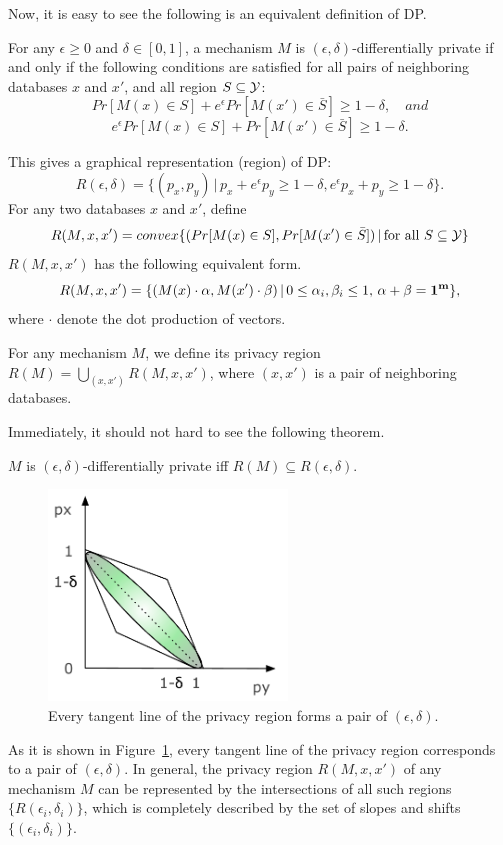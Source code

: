 \documentclass[11pt]{article}
\begin{document}
Now, it is easy to see the following is an equivalent definition of DP.
\begin{theorem}
For any $\epsilon \geq 0$ and $\delta \in [0, 1]$, a mechanism $M$ is $(\epsilon, \delta)$-differentially private if and only if the following conditions are satisfied for all pairs of neighboring databases $x$ and $x'$, and all region $S \subseteq {\cal Y}$:
\[
Pr[M(x) \in S]+e^{\epsilon}Pr[M(x') \in \bar{S}] \geq 1-\delta , \quad and
\]
\[
e^{\epsilon}Pr[M(x) \in S]+Pr[M(x') \in \bar{S}]  \geq 1-\delta .
\]
\end{theorem}
This gives a graphical representation (region) of DP:
\[
R(\epsilon, \delta) = \{(p_{x},p_{y}) \,|\, p_{x}+e^{\epsilon}p_{y} \geq1 - \delta,  e^{\epsilon}p_{x}+p_{y} \geq 1 - \delta\} .
\]
For any two databases $x$ and $x'$, define
\[
R(M, x, x') = convex \{(Pr[M(x) \in S], Pr[M(x') \in \bar{S}]) \,|\, \text{for all }S \subseteq {\cal Y} \}
\]
$R(M,x,x')$ has the following equivalent form.
\[
R(M,x,x') = \{ (M(x) \cdot {\bf \alpha}, M(x') \cdot {\bf \beta}) \,|\, 0 \leq \alpha_{i}, \beta_{i} \leq 1, \, {\bf \alpha} +{\bf \beta} = {\bf 1^{m}} \},
\] 
where $\cdot$ denote the dot production of vectors.
\begin{definition}
For any mechanism $M$, we define its privacy region $R(M) = \bigcup_{(x , x')} R(M, x, x') $, where $(x,x')$ is a pair of neighboring databases.
\end{definition}
Immediately, it should not hard to see the following theorem.
\begin{theorem}
 $M$ is $(\epsilon, \delta)$-differentially private iff $R(M) \subseteq R(\epsilon, \delta) $.
 \end{theorem}
\begin{figure}[th]
\centering
\includegraphics[width=2.5in]{fig/privacyregion.pdf}
\caption{\label{privacy_region} Every tangent line of the privacy region forms a pair of $(\epsilon, \delta)$. }
\end{figure}
As it is shown in Figure~\ref{privacy_region}, every tangent line of the privacy region corresponds to a pair of $(\epsilon, \delta)$. In general, the privacy region $R(M, x, x')$ of any mechanism $M$ can be represented by the intersections of all such regions $\{R(\epsilon_{i}, \delta_{i})\}$, which is completely described by the set of slopes and shifts $\{(\epsilon_{i}, \delta_{i})\}$.
\end{document}

